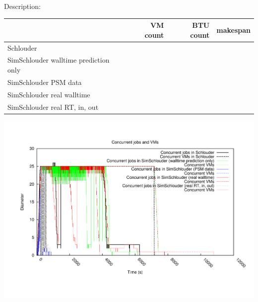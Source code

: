 \documentclass[16pt]{article}
\newlength{\btutikzwidth}
\newlength{\btutikzheight}
\begin{document}
\title{}
\date{\today}
 
\maketitle
\thispagestyle{plain}

Description: 

\begin{center}
\begin{tabular}{l|rrr}

				& VM count & BTU count & makespan \\
				 \hline
 Schlouder 			&  \\
 SimSchlouder walltime prediction only 	&  \\
 SimSchlouder PSM data					&  \\
 SimSchlouder real walltime			 	&  \\
 SimSchlouder real RT, in, out			&  \\
 \hline
\end{tabular}
\end{center}

\includegraphics[width=\textwidth]{data/diameter.pdf}

\newpage


\setlength{\pdfpagewidth}{\btutikzwidth}
\setlength{\pdfpageheight}{\btutikzheight}
\vspace*{-2.5cm}
\hspace*{-3cm}
\begin{tikzpicture}[scale=0.9]

\end{tikzpicture}
 
\end{document}
